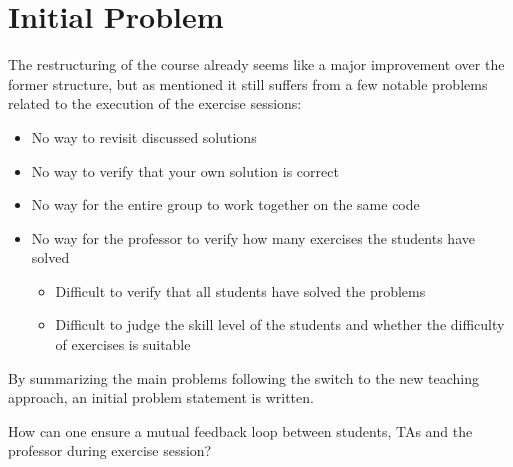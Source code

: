 \section{Initial Problem} \label{sec:initial-problem}
The restructuring of the course already seems like a major improvement over the former structure, but as mentioned it still suffers from a few notable problems related to the execution of the exercise sessions:
\begin{itemize}
	\item No way to revisit discussed solutions
	\item No way to verify that your own solution is correct
	\item No way for the entire group to work together on the same code
	\item No way for the professor to verify how many exercises the students have solved
	\begin{itemize}
		\item Difficult to verify that all students have solved the problems
		\item Difficult to judge the skill level of the students and whether the difficulty of exercises is suitable
	\end{itemize}
\end{itemize}

By summarizing the main problems following the switch to the new teaching approach, an initial problem statement is written.
\begin{displayquote}
How can one ensure a mutual feedback loop between students, TAs and the professor during exercise session?
\end{displayquote} 

